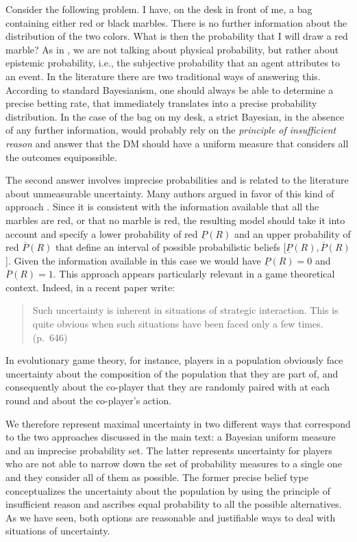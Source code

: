 \documentclass[fleqn,reqno,12pt]{article}
\theoremstyle{Satz}
\theoremstyle{Bsp}
\begin{document}
Consider the following problem. I have, on the desk in front of me, a bag containing either red
or black marbles. There is no further information about the distribution of the two
colors. What is then the probability that I will draw a red marble? As in \citet{walley96}, we
are not talking about physical probability, but rather about epistemic probability, i.e., the
subjective probability that an agent attributes to an event.  In the literature there are two
traditional ways of answering this. According to standard Bayesianism, one should always be
able to determine a precise betting rate, that immediately translates into a precise
probability distribution. In the case
of the bag on my desk, a strict Bayesian, in the absence of any further information, would
probably rely on the \textit{principle of insufficient reason} and answer that the DM should
have a uniform measure that considers all the outcomes equipossible.


The second answer involves imprecise probabilities and is related to the literature about
unmeasurable uncertainty. Many authors argued in favor of this kind of approach
\citep[e.g.,][]{levi74,gardsah82,walley96}. Since it is consistent with the information
available that all the marbles are red, or that no marble is red, the resulting model should
take it into account and specify a lower probability of red $\underline{P}(R)$ and an upper
probability of red $\overline{P}(R)$ that define an interval of possible probabilistic beliefs
[$\underline{P}(R), \overline{P}(R)$]. Given the information available in this case we would
have $\underline{P}(R)=0$ and $\overline{P}(R)=1$. This approach appears particularly relevant
in a game theoretical context. Indeed, in a recent paper \citet{BattCerrMM15} write:

\begin{quote}
  Such uncertainty is inherent in situations of strategic interaction. This is quite obvious
  when such situations have been faced only a few times. (p.~646)
\end{quote}

\noindent In evolutionary game theory, for instance, players in a population obviously face
uncertainty about the composition of the population that they are part of, and consequently
about the co-player that they are randomly paired with at each round and about the co-player's
action. 

We therefore represent maximal uncertainty in two different ways that correspond to the two
approaches discussed in the main text: a Bayesian uniform measure and an imprecise probability
set. The latter represents uncertainty for players who are not able to narrow down the set of
probability measures to a single one and they consider all of them as possible. The former
precise belief type conceptualizes the uncertainty about the population by using the principle
of insufficient reason and ascribes equal probability to all the possible alternatives. As we
have seen, both options are reasonable and justifiable ways to deal with situations of
uncertainty.
\end{document}
